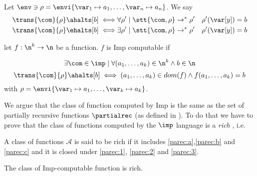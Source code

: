 \begin{notation}
  Let \(\env \ni \rho = \envi{\var_1\mapsto a_1, \dots, \var_n \mapsto
    a_n}\). We say
  \begin{align*}
    \trans{\com}{\rho}\ahalts[b] \iff & \forall \rho' \mid \stt{\com, \rho} \to^* \rho' \quad \rho'(\var[y]) = b \\
    \trans{\com}{\rho}\ehalts[b] \iff & \exists \rho' \mid \stt{\com, \rho} \to^* \rho' \quad \rho'(\var[y]) = b
  \end{align*}
\end{notation}



\begin{definition}
  let \(f : \n^k \to \n\) be a function. \(f\) is Imp computable if

  \[\exists \com \in\imp \mid \forall (a_1, \dots, a_k) \in \n^k \wedge
  b \in \n \] \[\trans{\com}{\rho} \ahalts[b] \iff (a_1, \dots, a_k)
  \in dom(f) \wedge f(a_1,\dots,a_k) = b\] with \(\rho = \envi{\var_1
    \mapsto a_1, \dots, \var_k \mapsto a_k}\).
\end{definition}

We argue that the class of function computed by Imp is the same as the
set of partially recursive functions \(\partialrec\) (as defined in
\cite{cutland1980computability}). To do that we have to prove that the
class of functions computed by the \(\imp\) language is a \emph{rich}
, i.e.

\begin{definition}
  A class of functions \(\mathcal{A}\) is said to be rich if it
  includes \ref{parec:a},\ref{parec:b} and \ref{parec:c} and it is
  closed under \ref{parec:1}, \ref{parec:2} and \ref{parec:3}.
\end{definition}

\begin{lemma}
  The class of Imp-computable function is rich.
\end{lemma}

